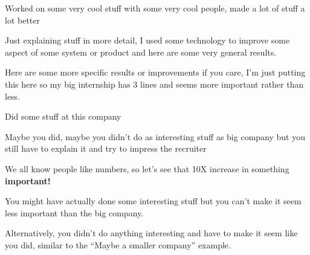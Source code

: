 
\begin{tightemize}
\item Worked on some very cool stuff with some very cool people, made a lot of stuff a lot better
\item Just explaining stuff in more detail, I used some technology to improve some aspect of some system or product and here are some very general results.
\item Here are some more specific results or improvements if you care, I'm just putting this here so my big internship has 3 lines and seems more important rather than less.
\end{tightemize}
\subsectionsep

\begin{tightemize}
\item Did some stuff at this company
\item Maybe you did, maybe you didn't do as interesting stuff as big company but you still have to explain it and try to impress the recruiter
\item We all know people like numbers, so let's see that 10X increase in something \textbf{important!}
\end{tightemize}
\subsectionsep

\begin{tightemize}
\item You might have actually done some interesting stuff but you can't make it seem less important than the big company.
\item Alternatively, you didn't do anything interesting and have to make it seem like you did, similar to the ``Maybe a smaller company'' example.
\end{tightemize}
\subsectionsep